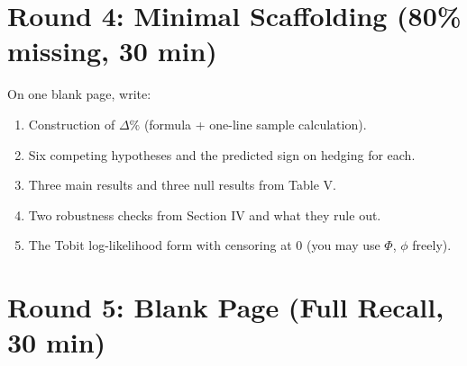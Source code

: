 \documentclass[11pt]{article}
\newcommand{\dP}{\Delta\%}
\begin{document}
\section*{Round 4: Minimal Scaffolding (80\% missing, 30 min)}
On one blank page, write:
\begin{enumerate}
\item Construction of $\dP$ (formula + one-line sample calculation).
\item Six competing hypotheses and the predicted sign on hedging for each.
\item Three main results and three null results from Table V.
\item Two robustness checks from Section IV and what they rule out.
\item The Tobit log-likelihood form with censoring at 0 (you may use $\Phi$, $\phi$ freely).
\end{enumerate}

\section*{Round 5: Blank Page (Full Recall, 30 min)}
\begin{center}
\end{center}

\newpage
\end{document}
